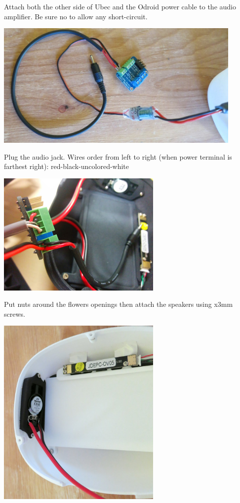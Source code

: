 \documentclass{article}
\begin{document}
Attach both the other side of Ubec and the Odroid power cable to the audio amplifier. Be sure no to allow any short-circuit.

\begin{center}
  \includegraphics[width=0.9\textwidth]{img/head_ampli_power}
 \end{center}
 
 
Plug the audio jack. Wires order from left to right (when power terminal is farthest right): red-black-uncolored-white

\begin{center}
  \includegraphics[width=0.6\textwidth]{img/audio_amp_connection_zoom}
 \end{center}

\newpage

Put  nuts around the flowers openings then attach the speakers using  x3mm screws.

\begin{center}
  \includegraphics[width=0.6\textwidth]{img/head_speaker}
 \end{center}
\end{document}
